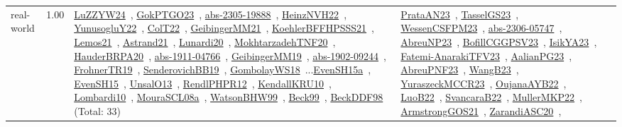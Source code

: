 {\begin{longtable}{p{3cm}r>{\raggedright\arraybackslash}p{6cm}>{\raggedright\arraybackslash}p{6cm}>{\raggedright\arraybackslash}p{8cm}}
\index{real-world}\index{Benchmarks!real-world}real-world &  1.00 & \href{../works/LuZZYW24.pdf}{LuZZYW24}~\cite{LuZZYW24}, \href{../works/GokPTGO23.pdf}{GokPTGO23}~\cite{GokPTGO23}, \href{../works/abs-2305-19888.pdf}{abs-2305-19888}~\cite{abs-2305-19888}, \href{../works/HeinzNVH22.pdf}{HeinzNVH22}~\cite{HeinzNVH22}, \href{../works/YunusogluY22.pdf}{YunusogluY22}~\cite{YunusogluY22}, \href{../works/ColT22.pdf}{ColT22}~\cite{ColT22}, \href{../works/GeibingerMM21.pdf}{GeibingerMM21}~\cite{GeibingerMM21}, \href{../works/KoehlerBFFHPSSS21.pdf}{KoehlerBFFHPSSS21}~\cite{KoehlerBFFHPSSS21}, \href{../works/Lemos21.pdf}{Lemos21}~\cite{Lemos21}, \href{../works/Astrand21.pdf}{Astrand21}~\cite{Astrand21}, \href{../works/Lunardi20.pdf}{Lunardi20}~\cite{Lunardi20}, \href{../works/MokhtarzadehTNF20.pdf}{MokhtarzadehTNF20}~\cite{MokhtarzadehTNF20}, \href{../works/HauderBRPA20.pdf}{HauderBRPA20}~\cite{HauderBRPA20}, \href{../works/abs-1911-04766.pdf}{abs-1911-04766}~\cite{abs-1911-04766}, \href{../works/GeibingerMM19.pdf}{GeibingerMM19}~\cite{GeibingerMM19}, \href{../works/abs-1902-09244.pdf}{abs-1902-09244}~\cite{abs-1902-09244}, \href{../works/FrohnerTR19.pdf}{FrohnerTR19}~\cite{FrohnerTR19}, \href{../works/SenderovichBB19.pdf}{SenderovichBB19}~\cite{SenderovichBB19}, \href{../works/GombolayWS18.pdf}{GombolayWS18}~\cite{GombolayWS18}...\href{../works/EvenSH15a.pdf}{EvenSH15a}~\cite{EvenSH15a}, \href{../works/EvenSH15.pdf}{EvenSH15}~\cite{EvenSH15}, \href{../works/UnsalO13.pdf}{UnsalO13}~\cite{UnsalO13}, \href{../works/RendlPHPR12.pdf}{RendlPHPR12}~\cite{RendlPHPR12}, \href{../works/KendallKRU10.pdf}{KendallKRU10}~\cite{KendallKRU10}, \href{../works/Lombardi10.pdf}{Lombardi10}~\cite{Lombardi10}, \href{../works/MouraSCL08a.pdf}{MouraSCL08a}~\cite{MouraSCL08a}, \href{../works/WatsonBHW99.pdf}{WatsonBHW99}~\cite{WatsonBHW99}, \href{../works/Beck99.pdf}{Beck99}~\cite{Beck99}, \href{../works/BeckDDF98.pdf}{BeckDDF98}~\cite{BeckDDF98} (Total: 33) & \href{../works/PrataAN23.pdf}{PrataAN23}~\cite{PrataAN23}, \href{../works/TasselGS23.pdf}{TasselGS23}~\cite{TasselGS23}, \href{../works/WessenCSFPM23.pdf}{WessenCSFPM23}~\cite{WessenCSFPM23}, \href{../works/abs-2306-05747.pdf}{abs-2306-05747}~\cite{abs-2306-05747}, \href{../works/AbreuNP23.pdf}{AbreuNP23}~\cite{AbreuNP23}, \href{../works/BofillCGGPSV23.pdf}{BofillCGGPSV23}~\cite{BofillCGGPSV23}, \href{../works/IsikYA23.pdf}{IsikYA23}~\cite{IsikYA23}, \href{../works/Fatemi-AnarakiTFV23.pdf}{Fatemi-AnarakiTFV23}~\cite{Fatemi-AnarakiTFV23}, \href{../works/AalianPG23.pdf}{AalianPG23}~\cite{AalianPG23}, \href{../works/AbreuPNF23.pdf}{AbreuPNF23}~\cite{AbreuPNF23}, \href{../works/WangB23.pdf}{WangB23}~\cite{WangB23}, \href{../works/YuraszeckMCCR23.pdf}{YuraszeckMCCR23}~\cite{YuraszeckMCCR23}, \href{../works/OujanaAYB22.pdf}{OujanaAYB22}~\cite{OujanaAYB22}, \href{../works/LuoB22.pdf}{LuoB22}~\cite{LuoB22}, \href{../works/SvancaraB22.pdf}{SvancaraB22}~\cite{SvancaraB22}, \href{../works/MullerMKP22.pdf}{MullerMKP22}~\cite{MullerMKP22}, \href{../works/ArmstrongGOS21.pdf}{ArmstrongGOS21}~\cite{ArmstrongGOS21}, \href{../works/ZarandiASC20.pdf}{ZarandiASC20}~\cite{ZarandiASC20}, 
\end{longtable}}
